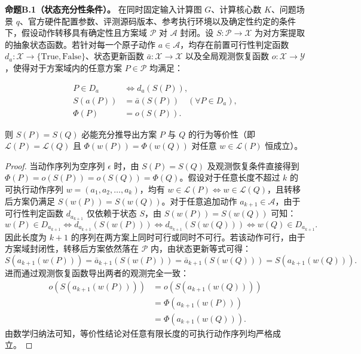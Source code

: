 \documentclass[anonymous,withtoc]{gmcm2026}
\begin{document}
\textbf{命题B.1（状态充分性条件）。} 在同时固定输入计算图 \(G\)、计算核心数 \(K\)、问题场景 \(q\)、官方硬件配置参数、评测源码版本、参考执行环境以及确定性约定的条件下，假设动作转移具有确定性且方案域 \(\mathcal{P}\) 对 \(\mathcal{A}\) 封闭。设 \(S: \mathcal{P} \to \mathcal{X}\) 为对方案提取的抽象状态函数。若针对每一个原子动作 \(a \in \mathcal{A}\)，均存在前置可行性判定函数 \(d_a: \mathcal{X} \to \{\text{True}, \text{False}\}\)、状态更新函数 \(\bar{a}: \mathcal{X} \to \mathcal{X}\) 以及全局观测恢复函数 \(o: \mathcal{X} \to \mathcal{Y}\)，使得对于方案域内的任意方案 \(P \in \mathcal{P}\) 均满足：

\begin{equation}
\begin{aligned}
P \in D_a &\iff d_a(S(P)), \\
S(a(P)) &= \bar{a}(S(P)) \quad (\forall P \in D_a), \\
\Phi(P) &= o(S(P)).
\end{aligned}
\end{equation}

则 \(S(P) = S(Q)\) 必能充分推导出方案 \(P\) 与 \(Q\) 的行为等价性（即 \(\mathcal{L}(P) = \mathcal{L}(Q)\) 且 \(\Phi(w(P)) = \Phi(w(Q))\) 对任意 \(w \in \mathcal{L}(P)\) 恒成立）。

\begin{proof} 当动作序列为空序列 \(\epsilon\) 时，由 \(S(P) = S(Q)\) 及观测恢复条件直接得到 \(\Phi(P) = o(S(P)) = o(S(Q)) = \Phi(Q)\)。假设对于任意长度不超过 \(k\) 的可执行动作序列 \(w = (a_1, a_2, \dots, a_k)\)，均有 \(w \in \mathcal{L}(P) \iff w \in \mathcal{L}(Q)\)，且转移后方案仍满足 \(S(w(P)) = S(w(Q))\)。对于任意追加动作 \(a_{k+1} \in \mathcal{A}\)，由于可行性判定函数 \(d_{a_{k+1}}\) 仅依赖于状态 \(S\)，由 \(S(w(P)) = S(w(Q))\) 可知： \begin{equation}
w(P) \in D_{a_{k+1}} \iff d_{a_{k+1}}(S(w(P))) \iff d_{a_{k+1}}(S(w(Q))) \iff w(Q) \in D_{a_{k+1}}.
\end{equation} 因此长度为 \(k+1\) 的序列在两方案上同时可行或同时不可行。若该动作可行，由于方案域封闭性，转移后方案依然落在 \(\mathcal{P}\) 内，由状态更新等式可得： \begin{equation}
S(a_{k+1}(w(P))) = \bar{a}_{k+1}(S(w(P))) = \bar{a}_{k+1}(S(w(Q))) = S(a_{k+1}(w(Q))).
\end{equation} 进而通过观测恢复函数导出两者的观测完全一致： \begin{equation}
\begin{aligned}
o(S(a_{k+1}(w(P)))) &= o(S(a_{k+1}(w(Q)))) \\
&= \Phi(a_{k+1}(w(P))) \\
&= \Phi(a_{k+1}(w(Q))).
\end{aligned}
\end{equation} 由数学归纳法可知，等价性结论对任意有限长度的可执行动作序列均严格成立。 \end{proof}
\end{document}
